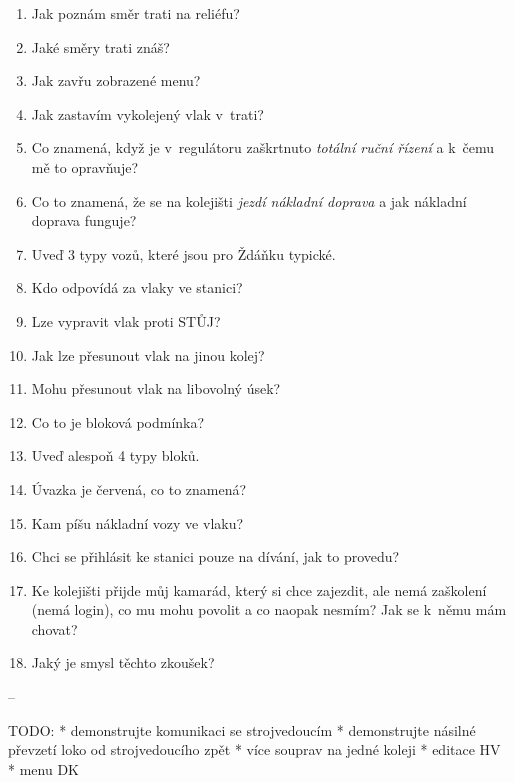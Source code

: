 \documentclass[12pt,a4paper]{article}
\begin{document}
\begin{enumerate}[leftmargin=*]
\item Jak poznám směr trati na reliéfu?

\item Jaké směry trati znáš?

\item Jak zavřu zobrazené menu?

\item Jak zastavím vykolejený vlak v~trati?

\item Co znamená, když je v~regulátoru zaškrtnuto \textit{totální ruční řízení}
a k~čemu mě to opravňuje?

\item Co to znamená, že se na kolejišti \textit{jezdí nákladní doprava} a jak
nákladní doprava funguje?

\item Uveď 3 typy vozů, které jsou pro Ždáňku typické.

\item Kdo odpovídá za vlaky ve stanici?

\item Lze vypravit vlak proti STŮJ?

\item Jak lze přesunout vlak na jinou kolej?

\item Mohu přesunout vlak na libovolný úsek?

\item Co to je bloková podmínka?

\item Uveď alespoň 4 typy bloků.

\item Úvazka je červená, co to znamená?

\item Kam píšu nákladní vozy ve vlaku?

\item Chci se přihlásit ke stanici pouze na dívání, jak to provedu?

\item Ke kolejišti přijde můj kamarád, který si chce zajezdit, ale nemá
zaškolení (nemá login), co mu mohu povolit a co naopak nesmím? Jak se k~němu
mám chovat?

\item Jaký je smysl těchto zkoušek?

\end{enumerate}

--

TODO:
 * demonstrujte komunikaci se strojvedoucím
 * demonstrujte násilné převzetí loko od strojvedoucího zpět
 * více souprav na jedné koleji
 * editace HV
 * menu DK
\end{document}

